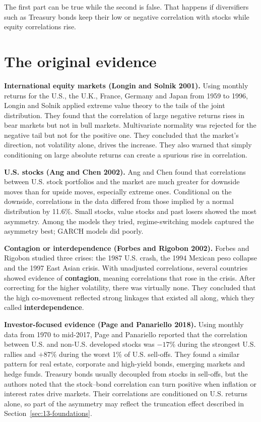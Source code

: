 The first part can be true while the second is false. That happens if diversifiers such as Treasury bonds keep their low or negative correlation with stocks while equity correlations rise.

\section{The original evidence}
\label{sec:13-evidence}

\textbf{International equity markets (Longin and Solnik 2001).} Using monthly returns for the U.S., the U.K., France, Germany and Japan from 1959 to 1996, Longin and Solnik applied extreme value theory to the tails of the joint distribution. They found that the correlation of large negative returns rises in bear markets but not in bull markets. Multivariate normality was rejected for the negative tail but not for the positive one. They concluded that the market's direction, not volatility alone, drives the increase. They also warned that simply conditioning on large absolute returns can create a spurious rise in correlation.

\textbf{U.S. stocks (Ang and Chen 2002).} Ang and Chen found that correlations between U.S. stock portfolios and the market are much greater for downside moves than for upside moves, especially extreme ones. Conditional on the downside, correlations in the data differed from those implied by a normal distribution by 11.6\%. Small stocks, value stocks and past losers showed the most asymmetry. Among the models they tried, regime-switching models captured the asymmetry best; GARCH models did poorly.

\textbf{Contagion or interdependence (Forbes and Rigobon 2002).} Forbes and Rigobon studied three crises: the 1987 U.S. crash, the 1994 Mexican peso collapse and the 1997 East Asian crisis. With unadjusted correlations, several countries showed evidence of \textbf{contagion}, meaning correlations that rose in the crisis. After correcting for the higher volatility, there was virtually none. They concluded that the high co-movement reflected strong linkages that existed all along, which they called \textbf{interdependence}.

\textbf{Investor-focused evidence (Page and Panariello 2018).} Using monthly data from 1970 to mid-2017, Page and Panariello reported that the correlation between U.S. and non-U.S. developed stocks was $-17\%$ during the strongest U.S. rallies and $+87\%$ during the worst 1\% of U.S. sell-offs. They found a similar pattern for real estate, corporate and high-yield bonds, emerging markets and hedge funds. Treasury bonds usually decoupled from stocks in sell-offs, but the authors noted that the stock--bond correlation can turn positive when inflation or interest rates drive markets. Their correlations are conditioned on U.S. returns alone, so part of the asymmetry may reflect the truncation effect described in Section~\ref{sec:13-foundations}.

